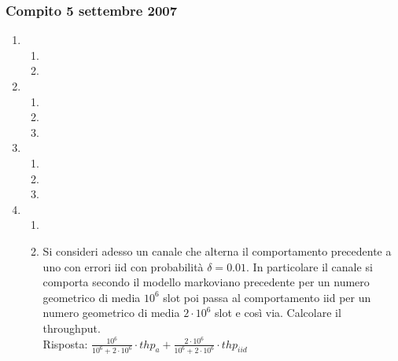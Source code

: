 \documentclass{article}
\begin{document}
\newpage
\subsubsection{Compito 5 settembre 2007}
\begin{enumerate}

    \item\begin{enumerate}[label=\alph*)]
        \item
        \item
    \end{enumerate}
    
    \item\begin{enumerate}[label=\alph*)]
        \item
        \item
        \item
    \end{enumerate}
    
    \item\begin{enumerate}[label=\alph*)]
        \item
        \item
        \item
    \end{enumerate}
    
    \item 
    \begin{enumerate}[label=\alph*)]
    		\item
    		\item Si consideri adesso un canale che alterna il comportamento precedente a uno con errori iid con probabilità $\delta=0.01$.
    		In particolare il canale si comporta secondo il modello markoviano precedente per un numero geometrico di media $10^6$ slot poi passa al comportamento iid per un numero geometrico di media $2\cdot 10^6$ slot e così via.
    		Calcolare il throughput.\\
    		
    		Risposta: $\frac{10^6}{10^6+2\cdot 10^6}\cdot thp_{a} + \frac{2\cdot 10^6}{10^6+2\cdot 10^6}\cdot thp_{iid}$
    \end{enumerate}
\end{enumerate}

\newpage
\end{document}
